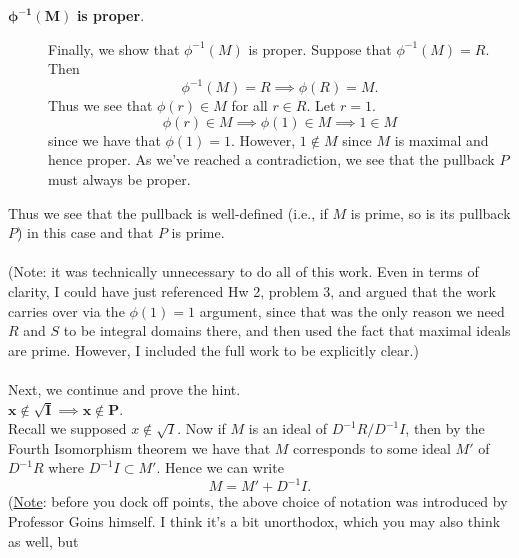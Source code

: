 \begin{prf}
\begin{enumerate}
\begin{itemize}
\begin{description}
                    \item[$\bm{\phi^{-1}(M)}$ \textbf{is proper}.] Finally, we show
                    that $\phi^{-1}(M)$ is proper. Suppose that $\phi^{-1}(M) = R$. Then 
                    \[
                        \phi^{-1}(M) = R \implies \phi(R) = M.   
                    \]
                    Thus we see that $\phi(r) \in M$ for all $r \in R$.
                    Let $r = 1$. 
                    \[
                        \phi(r) \in M \implies \phi(1) \in M \implies 1 \in M
                    \]
                    since we have that $\phi(1) = 1$.
                    However, $1 \not\in M$ since $M$ is maximal and hence
                    proper. As we've reached a contradiction, we see that
                    the pullback $P$ must always be proper. 
                \end{description} 
            \end{itemize}
            Thus we see that the pullback is well-defined (i.e., if $M$ is
            prime, so is its pullback $P$) in this case and
            that $P$ is prime. 
            \\
            \\
            (Note: it was technically unnecessary to do all of this work.
            Even in terms of clarity, I could have just referenced Hw 2,
            problem 3, and argued that the work carries over via the
            $\phi(1) = 1$ argument, since that was the only reason we 
            need $R$ and $S$ to be integral domains there, and then used
            the fact that maximal ideals are prime. However, I included
            the full work to be explicitly clear.)
            \\
            \\
            Next, we continue and prove the hint.\\
            \underline{$\bm{x \not\in \sqrt{I} \implies x \not\in
            P}$}.\\[1.2ex]
            Recall we supposed $x \not\in \sqrt{I}$. Now
            if $M$ is an ideal of $D^{-1}R/D^{-1}I$, then by the Fourth
            Isomorphism theorem we have that $M$ corresponds to some ideal
            $M'$ of $D^{-1}R$ where $D^{-1}I \subset M'$. Hence we can
            write  
            \[
                M = M' +  D^{-1}I.
            \]
            (\underline{Note}: before you dock off points, the above choice of
            notation was introduced by Professor Goins himself. I think
            it's a bit unorthodox, which you may also think as well, but

\end{enumerate}
\end{prf}
